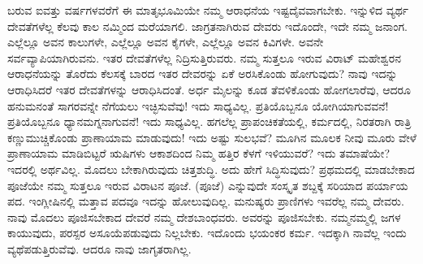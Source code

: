 \vskip 2pt

ಬರುವ ಐವತ್ತು ವರ್ಷಗಳವರೆಗೆ ಈ ಮಾತೃಭೂಮಿಯೇ ನಮ್ಮ ಆರಾಧನೆಯ ಇಷ್ಟದೈವವಾಗಬೇಕು. ಇನ್ನುಳಿದ ವ್ಯರ್ಥ ದೇವತೆಗಳೆಲ್ಲ ಕೆಲವು ಕಾಲ ನಮ್ಮಿಂದ ಮರೆಯಾಗಲಿ. ಜಾಗ್ರತನಾಗಿರುವ ದೇವರು ಇದೊಂದೇ, ಇದೇ ನಮ್ಮ ಜನಾಂಗ. ಎಲ್ಲೆಲ್ಲೂ ಅವನ ಕಾಲುಗಳೇ, ಎಲ್ಲೆಲ್ಲೂ ಅವನ ಕೈಗಳೇ, ಎಲ್ಲೆಲ್ಲೂ ಅವನ ಕಿವಿಗಳೇ. ಅವನೇ ಸರ್ವವ್ಯಾಪಿಯಾಗಿರುವನು. ಇತರ ದೇವತೆಗಳೆಲ್ಲ ನಿದ್ರಿಸುತ್ತಿರುವರು. ನಮ್ಮ ಸುತ್ತಲೂ ಇರುವ ವಿರಾಟ್​ ಮಹೇಶ್ವರನ ಆರಾಧನೆಯನ್ನು ತೊರೆದು ಕೆಲಸಕ್ಕೆ ಬಾರದ ಇತರ ದೇವರನ್ನು ಏಕೆ ಅರಸಿಕೊಂಡು ಹೋಗುವುದು? ನಾವು ಇದನ್ನು ಆರಾಧಿಸಿದರೆ ಇತರ ದೇವತೆಗಳನ್ನು ಆರಾಧಿಸಿದಂತೆ. ಅರ್ಧ ಮೈಲನ್ನು ಕೂಡ ತೆವಳಿಕೊಂಡು ಹೋಗಲಾರೆವು, ಆದರೂ ಹನುಮನಂತೆ ಸಾಗರವನ್ನೇ ನೆಗೆಯಲು ಇಚ್ಛಿಸುವೆವು! ಇದು ಸಾಧ್ಯವಿಲ್ಲ. ಪ್ರತಿಯೊಬ್ಬನೂ ಯೋಗಿಯಾಗುವವನೆ! ಪ್ರತಿಯೊಬ್ಬನೂ ಧ್ಯಾನಮಗ್ನನಾಗುವನೆ! ಇದು ಸಾಧ್ಯವಿಲ್ಲ. ಹಗಲೆಲ್ಲ ಪ್ರಾಪಂಚಿಕತೆಯಲ್ಲಿ, ಕರ್ಮದಲ್ಲಿ, ನಿರತರಾಗಿ ರಾತ್ರಿ ಕಣ್ಣುಮುಚ್ಚಿಕೊಂಡು ಪ್ರಾಣಾಯಾಮ ಮಾಡುವುದು! ಇದು ಅಷ್ಟು ಸುಲಭವೆ? ಮೂಗಿನ ಮೂಲಕ ನೀವು ಮೂರು ವೇಳೆ ಪ್ರಾಣಾಯಾಮ ಮಾಡಿಬಿಟ್ಟರೆ ಋಷಿಗಳು ಆಕಾಶದಿಂದ ನಿಮ್ಮ ಹತ್ತಿರ ಕೆಳಗೆ ಇಳಿಯುವರೆ? ಇದು ತಮಾಷೆಯೇ? ಇದರಲ್ಲಿ ಅರ್ಥವಿಲ್ಲ. ಮೊದಲು ಬೇಕಾಗಿರುವುದು ಚಿತ್ತಶುದ್ಧಿ. ಅದು ಹೇಗೆ ಸಿದ್ಧಿಸುವುದು? ಪ್ರಥಮದಲ್ಲಿ ಮಾಡಬೇಕಾದ ಪೂಜೆಯೇ ನಮ್ಮ ಸುತ್ತಲೂ ಇರುವ ವಿರಾಟನ ಪೂಜೆ.  (ಪೂಜೆ) ಎನ್ನುವುದೇ ಸಂಸ್ಕೃತ ಶಬ್ದಕ್ಕೆ ಸರಿಯಾದ ಪರ್ಯಾಯ ಪದ. ಇಂಗ್ಲೀಷಿನಲ್ಲಿ ಮತ್ತಾವ ಪದವೂ ಇದನ್ನು ಹೋಲುವುದಿಲ್ಲ. ಮನುಷ್ಯರು ಪ್ರಾಣಿಗಳು ಇವರೆಲ್ಲ ನಮ್ಮ ದೇವರು. ನಾವು ಮೊದಲು ಪೂಜಿಸಬೇಕಾದ ದೇವರೆ ನಮ್ಮ ದೇಶಬಾಂಧವರು. ಅವರನ್ನು ಪೂಜಿಸಬೇಕು. ನಮ್ಮನಮ್ಮಲ್ಲಿ ಜಗಳ ಕಾಯುವುದು, ಪರಸ್ಪರ ಅಸೂಯೆಪಡುವುದು ನಿಲ್ಲಬೇಕು. ಇದೊಂದು ಭಯಂಕರ ಕರ್ಮ. ಇದಕ್ಕಾಗಿ ನಾವೆಲ್ಲ ಇಂದು ವ್ಯಥೆಪಡುತ್ತಿರುವೆವು. ಆದರೂ ನಾವು ಜಾಗೃತರಾಗಿಲ್ಲ.

\vskip 3pt

